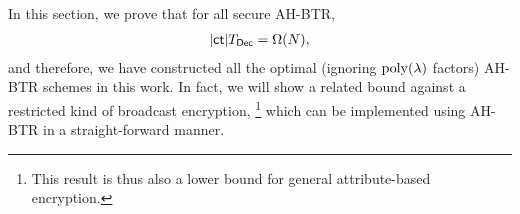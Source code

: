 In this section, we prove that for all secure AH-BTR,
\begin{align*}
|\ct|\TDec=\Omega(N),
\end{align*}
and therefore, we have constructed all the optimal (ignoring $\operatorname{poly}(\lambda)$ factors) AH-BTR schemes in this work.
In fact, we will show a related bound against a restricted kind of broadcast encryption,%
\footnote{This result is thus also a lower bound for general attribute-based encryption.}
which can be implemented using AH-BTR in a straight-forward manner.
